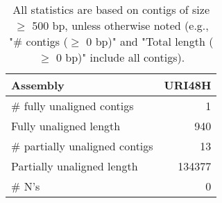 \documentclass[12pt,a4paper]{article}
\begin{document}
\begin{table}[ht]
\begin{center}
\caption{All statistics are based on contigs of size $\geq$ 500 bp, unless otherwise noted (e.g., "\# contigs ($\geq$ 0 bp)" and "Total length ($\geq$ 0 bp)" include all contigs).}
\begin{tabular}{|l*{1}{|r}|}
\hline
Assembly & URI48H \\ \hline
\# fully unaligned contigs & 1 \\ \hline
Fully unaligned length & 940 \\ \hline
\# partially unaligned contigs & 13 \\ \hline
Partially unaligned length & 134377 \\ \hline
\# N's & 0 \\ \hline
\end{tabular}
\end{center}
\end{table}
\end{document}
